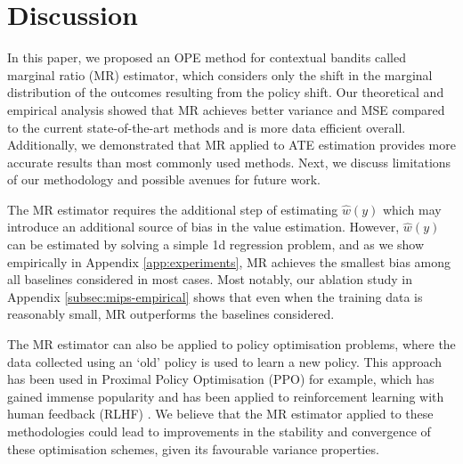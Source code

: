 \section{Discussion}
%
%
%
%
%

In this paper, we proposed an OPE method for contextual bandits called marginal ratio (MR) estimator, which considers only the shift in the marginal distribution of the outcomes resulting from the policy shift. Our theoretical and empirical analysis showed that MR achieves better variance and MSE compared to the current state-of-the-art methods and is more data efficient overall. Additionally, we demonstrated that MR applied to ATE estimation provides more accurate results than most commonly used methods. Next, we discuss limitations of our methodology and possible avenues for future work.

The MR estimator requires the additional step of estimating $\hat{w}(y)$ which may introduce an additional source of bias in the value estimation. However, $\hat{w}(y)$ can be estimated by solving a simple 1d regression problem, and as we show empirically in Appendix \ref{app:experiments}, MR achieves the smallest bias among all baselines considered in most cases. Most notably, our ablation study in Appendix \ref{subsec:mips-empirical} shows that even when the training data is reasonably small, MR outperforms the baselines considered. 
%


The MR estimator can also be applied to policy optimisation problems, where the data collected using an `old' policy is used to learn a new policy. This approach has been used in Proximal Policy Optimisation (PPO) \citep{schulman2017proximal} for example, which has gained immense popularity and has been applied to reinforcement learning with human feedback (RLHF) \citep{lambert2022illustrating}. We believe that the MR estimator applied to these methodologies could lead to improvements in the stability and convergence of these optimisation schemes, given its favourable variance properties.

